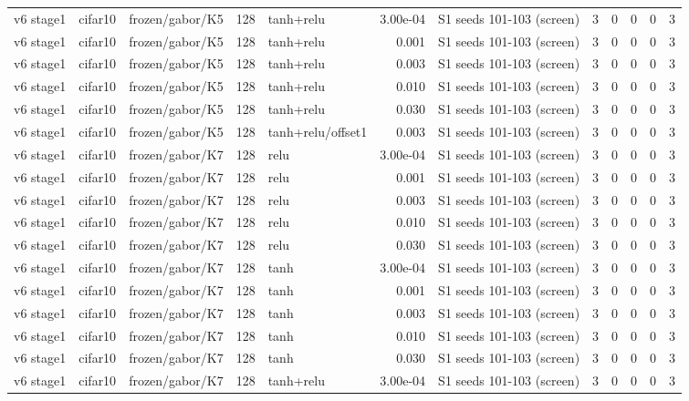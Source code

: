 \begin{table}[htbp]
{\begin{tabular}{@{}lllrlrlrrrrr@{}}
v6 stage1 & cifar10 & frozen/gabor/K5 & 128 & tanh+relu & 3.00e-04 & S1 seeds 101-103 (screen) & 3 & 0 & 0 & 0 & 3 \\
v6 stage1 & cifar10 & frozen/gabor/K5 & 128 & tanh+relu & 0.001 & S1 seeds 101-103 (screen) & 3 & 0 & 0 & 0 & 3 \\
v6 stage1 & cifar10 & frozen/gabor/K5 & 128 & tanh+relu & 0.003 & S1 seeds 101-103 (screen) & 3 & 0 & 0 & 0 & 3 \\
v6 stage1 & cifar10 & frozen/gabor/K5 & 128 & tanh+relu & 0.010 & S1 seeds 101-103 (screen) & 3 & 0 & 0 & 0 & 3 \\
v6 stage1 & cifar10 & frozen/gabor/K5 & 128 & tanh+relu & 0.030 & S1 seeds 101-103 (screen) & 3 & 0 & 0 & 0 & 3 \\
v6 stage1 & cifar10 & frozen/gabor/K5 & 128 & tanh+relu/offset1 & 0.003 & S1 seeds 101-103 (screen) & 3 & 0 & 0 & 0 & 3 \\
v6 stage1 & cifar10 & frozen/gabor/K7 & 128 & relu & 3.00e-04 & S1 seeds 101-103 (screen) & 3 & 0 & 0 & 0 & 3 \\
v6 stage1 & cifar10 & frozen/gabor/K7 & 128 & relu & 0.001 & S1 seeds 101-103 (screen) & 3 & 0 & 0 & 0 & 3 \\
v6 stage1 & cifar10 & frozen/gabor/K7 & 128 & relu & 0.003 & S1 seeds 101-103 (screen) & 3 & 0 & 0 & 0 & 3 \\
v6 stage1 & cifar10 & frozen/gabor/K7 & 128 & relu & 0.010 & S1 seeds 101-103 (screen) & 3 & 0 & 0 & 0 & 3 \\
v6 stage1 & cifar10 & frozen/gabor/K7 & 128 & relu & 0.030 & S1 seeds 101-103 (screen) & 3 & 0 & 0 & 0 & 3 \\
v6 stage1 & cifar10 & frozen/gabor/K7 & 128 & tanh & 3.00e-04 & S1 seeds 101-103 (screen) & 3 & 0 & 0 & 0 & 3 \\
v6 stage1 & cifar10 & frozen/gabor/K7 & 128 & tanh & 0.001 & S1 seeds 101-103 (screen) & 3 & 0 & 0 & 0 & 3 \\
v6 stage1 & cifar10 & frozen/gabor/K7 & 128 & tanh & 0.003 & S1 seeds 101-103 (screen) & 3 & 0 & 0 & 0 & 3 \\
v6 stage1 & cifar10 & frozen/gabor/K7 & 128 & tanh & 0.010 & S1 seeds 101-103 (screen) & 3 & 0 & 0 & 0 & 3 \\
v6 stage1 & cifar10 & frozen/gabor/K7 & 128 & tanh & 0.030 & S1 seeds 101-103 (screen) & 3 & 0 & 0 & 0 & 3 \\
v6 stage1 & cifar10 & frozen/gabor/K7 & 128 & tanh+relu & 3.00e-04 & S1 seeds 101-103 (screen) & 3 & 0 & 0 & 0 & 3 \\

\end{tabular}}
\end{table}
